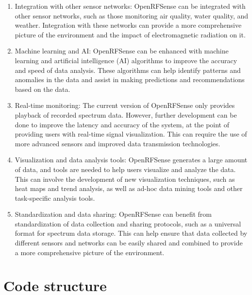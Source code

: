 \documentclass[
  letterpaper,
  a4paper,
  12pt,
  titlepage,
  oneside,
  openany]{book}
\providecommand{\tightlist}{%
  \setlength{\itemsep}{0pt}\setlength{\parskip}{0pt}}\usepackage{longtable,booktabs,array}
\begin{document}
\begin{enumerate}
\def\labelenumi{\arabic{enumi}.}
\tightlist
\item
  Integration with other sensor networks: OpenRFSense can be integrated
  with other sensor networks, such as those monitoring air quality,
  water quality, and weather. Integration with these networks can
  provide a more comprehensive picture of the environment and the impact
  of electromagnetic radiation on it.
\item
  Machine learning and AI: OpenRFSense can be enhanced with machine
  learning and artificial intelligence (AI) algorithms to improve the
  accuracy and speed of data analysis. These algorithms can help
  identify patterns and anomalies in the data and assist in making
  predictions and recommendations based on the data.
\item
  Real-time monitoring: The current version of OpenRFSense only provides
  playback of recorded spectrum data. However, further development can
  be done to improve the latency and accuracy of the system, at the
  point of providing users with real-time signal visualization. This can
  require the use of more advanced sensors and improved data
  transmission technologies.
\item
  Visualization and data analysis tools: OpenRFSense generates a large
  amount of data, and tools are needed to help users visualize and
  analyze the data. This can involve the development of new
  visualization techniques, such as heat maps and trend analysis, as
  well as ad-hoc data mining tools and other task-specific analysis
  tools.
\item
  Standardization and data sharing: OpenRFSense can benefit from
  standardization of data collection and sharing protocols, such as a
  universal format for spectrum data storage. This can help ensure that
  data collected by different sensors and networks can be easily shared
  and combined to provide a more comprehensive picture of the
  environment.
\end{enumerate}

\appendix



\hypertarget{code-structure}{%
\chapter{Code structure}\label{code-structure}}
\end{document}
